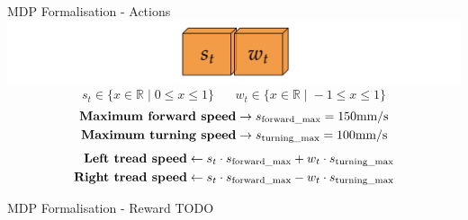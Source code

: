 \documentclass[aspectratio=169]{beamer}
\begin{document}
\begin{frame}{MDP Formalisation - Actions}
	\includegraphics[width=1\textwidth]{img/array.png}
	\begin{equation*}
	s_t \in \{x \in \mathbb{R} \;|\; 0 \le x \le 1\} \;\;\;\;\;\;	
	w_t \in \{x \in \mathbb{R} \;|\; -1 \le x \le 1\}
	\end{equation*}
	\begin{align*}
	\text{\textbf{Maximum forward speed}} &\rightarrow s_{\text{forward\_max}} = 150\text{mm/s}\\
	\text{\textbf{Maximum turning speed}} &\rightarrow s_{\text{turning\_max}} = 100\text{mm/s}
	\end{align*}
	\begin{align*}
	\text{\textbf{Left tread speed}} &\leftarrow s_t \cdot s_{\text{forward\_max}} + w_t \cdot s_{\text{turning\_max}}\\
	\text{\textbf{Right tread speed}} &\leftarrow s_t \cdot s_{\text{forward\_max}} - w_t \cdot s_{\text{turning\_max}}
	\end{align*}
	
\end{frame}


\begin{frame}{MDP Formalisation - Reward}
\centering
TODO
\end{frame}
\end{document}
